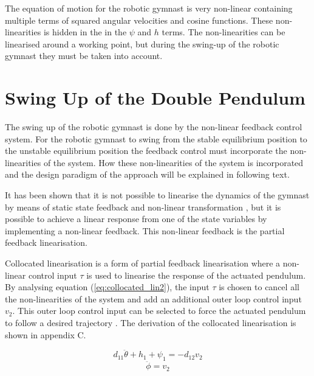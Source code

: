 \documentclass[a4paper,12pt]{article}
\begin{document}
	
	
	The equation of motion for the robotic gymnast is very non-linear containing multiple terms of squared angular velocities and cosine functions. These non-linearities is hidden in the in the $\psi$ and $h$ terms. The non-linearities can be linearised around a working point, but during the swing-up of the robotic gymnast they must be taken into account.
 
	
	
	\section{Swing Up of the Double Pendulum}
	The swing up of the robotic gymnast is done by the non-linear feedback control system. For the robotic gymnast to swing from the stable equilibrium position to the unstable equilibrium position the feedback control must incorporate the non-linearities of the system. How these non-linearities of the system is incorporated and the design paradigm of the approach will be explained in following text.
	
	It has been shown that it is not possible to linearise the dynamics of the gymnast by means of static state feedback and non-linear transformation \cite{murray}, but it is possible to achieve a linear response from one of the state variables by implementing a non-linear feedback. This non-linear feedback is the partial feedback linearisation.
	
	Collocated linearisation is a form of partial feedback linearisation where a non-linear control input $\tau$ is used to linearise the response of the actuated pendulum. By analysing equation (\ref{eq:collocated_lin2}), the input $\tau$ is chosen to cancel all the non-linearities of the system and add an additional outer loop control input $v_{2}$. This outer loop control input can be selected to force the actuated pendulum to follow a desired trajectory \cite{spong_swingup}. The derivation of the collocated linearisation is shown in appendix C.
	
	\begin{equation} \label{eq:collocated_lin1}
	d_{11}\ddot{\theta} + h_{1} + \psi_{1} = -d_{12}v_{2}
	\end{equation}
	\begin{equation} \label{eq:collocated_lin2}
	\ddot{\phi} = v_{2}
	\end{equation}
	
\end{document}
